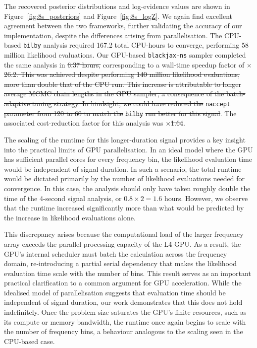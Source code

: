 \documentclass[fleqn,usenatbib]{mnras}
\providecommand{\DIFadd}[1]{{\protect\color{blue}\uwave{#1}}} %
\providecommand{\DIFdel}[1]{{\protect\color{red}\sout{#1}}}                      %
\providecommand{\DIFaddbegin}{} %
\providecommand{\DIFaddend}{} %
\providecommand{\DIFdelbegin}{} %
\providecommand{\DIFdelend}{} %
\newcommand{\DIFscaledelfig}{0.5}
\newlength{\DIFdelgraphicswidth} %
\newlength{\DIFdelgraphicsheight} %
\newcommand{\DIFaddincludegraphics}[2][]{{\color{blue}\fbox{\DIFOincludegraphics[#1]{#2}}}} %
\newcommand{\DIFdelincludegraphics}[2][]{%
\sbox{\DIFdelgraphicsbox}{\DIFOincludegraphics[#1]{#2}}%
\settoboxwidth{\DIFdelgraphicswidth}{\DIFdelgraphicsbox} %
\settoboxtotalheight{\DIFdelgraphicsheight}{\DIFdelgraphicsbox} %
\scalebox{\DIFscaledelfig}{%
\parbox[b]{\DIFdelgraphicswidth}{\usebox{\DIFdelgraphicsbox}\\[-\baselineskip] \rule{\DIFdelgraphicswidth}{0em}}\llap{\resizebox{\DIFdelgraphicswidth}{\DIFdelgraphicsheight}{%
\setlength{\unitlength}{\DIFdelgraphicswidth}%
\begin{picture}(1,1)%
\thicklines\linethickness{2pt} %
{\color[rgb]{1,0,0}\put(0,0){\framebox(1,1){}}}%
{\color[rgb]{1,0,0}\put(0,0){\line( 1,1){1}}}%
{\color[rgb]{1,0,0}\put(0,1){\line(1,-1){1}}}%
\end{picture}%
}\hspace*{3pt}}} %
} %
\DeclareRobustCommand{\DIFaddbegin}{\DIFOaddbegin \let\includegraphics\DIFaddincludegraphics} %
\DeclareRobustCommand{\DIFaddend}{\DIFOaddend \let\includegraphics\DIFOincludegraphics} %
\DeclareRobustCommand{\DIFdelbegin}{\DIFOdelbegin \let\includegraphics\DIFdelincludegraphics} %
\DeclareRobustCommand{\DIFdelend}{\DIFOaddend \let\includegraphics\DIFOincludegraphics} %
\begin{document}
The recovered posterior distributions and log-evidence values are shown
in Figure~\ref{fig:8s_posteriors} and Figure~\ref{fig:8s_logZ}. We again
find excellent agreement between the two frameworks, further validating
the accuracy of our implementation, despite the differences arising from 
parallelisation. The CPU-based \texttt{bilby} analysis required 167.2 total CPU-hours to
converge, performing 58 million likelihood evaluations. Our GPU-based
\texttt{blackjax-ns} sampler completed the same analysis in \DIFdelbegin \DIFdel{6.37 hours, }\DIFdelend \DIFaddbegin {} \DIFadd{hours, with }{} \DIFadd{million likelihood evaluations,
}\DIFaddend corresponding to a wall-time speedup factor of $\times$\DIFdelbegin \DIFdel{26.2. This was
achieved despite performing 140 million likelihood evaluations, more than
double that of the CPU run. This increase is attributable to longer average
MCMC chain lengths in the GPU sampler, a consequence of the
batch-adaptive tuning strategy. In hindsight, we could have reduced the
}\texttt{\DIFdel{naccept}} %
\DIFdel{parameter from 120 to 60 to match the }\texttt{\DIFdel{bilby}} %
\DIFdel{run better for
this signal}\DIFdelend \DIFaddbegin {}\DIFaddend . 
The associated cost-reduction factor for this
analysis was $\times$\DIFdelbegin \DIFdel{1.64}\DIFdelend \DIFaddbegin {}\DIFaddend .

The scaling of the runtime for this longer-duration signal provides a
key insight into the practical limits of GPU parallelisation. In an
ideal model where the GPU has sufficient parallel cores for every
frequency bin, the likelihood evaluation time would be independent of
signal duration. In such a scenario, the total runtime would be dictated
primarily by the number of likelihood evaluations needed for convergence.
In this case, the analysis should only have taken roughly double the time
of the 4-second signal analysis, or $0.8 \times 2 = 1.6$ hours. 
However, we observe that the runtime increased significantly more than
what would be predicted by the increase in likelihood evaluations alone.


This discrepancy arises because the computational load of the larger
frequency array exceeds the parallel processing capacity of the L4 GPU.
As a result, the GPU's internal scheduler must batch the calculation
across the frequency domain, re-introducing a partial serial dependency
that makes the likelihood evaluation time scale with the number of bins.
This result serves as an important practical clarification to a common
argument for GPU acceleration. While the idealised model of
parallelisation suggests that evaluation time should be independent of
signal duration, our work demonstrates that this does not hold
indefinitely. Once the problem size saturates the GPU's finite
resources, such as its compute or memory bandwidth, the runtime once
again begins to scale with the number of frequency bins, a behaviour
analogous to the scaling seen in the CPU-based case.
\end{document}
